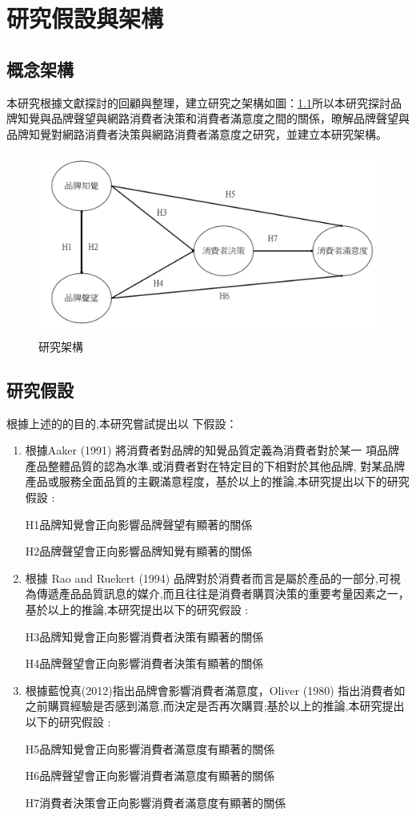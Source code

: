 \chapter{研究假設與架構}
\section{概念架構}
本研究根據文獻探討的回顧與整理，建立研究之架構如圖：\ref{fig:ARC}所以本研究探討品牌知覺與品牌聲望與網路消費者決策和消費者滿意度之間的關係，暸解品牌聲望與品牌知覺對網路消費者決策與網路消費者滿意度之研究，並建立本研究架構。


\begin{figure}[!t]
\centering
\includegraphics[width=14cm]{images/論文架構.png}
\caption{研究架構}
\label{fig:ARC}
\end{figure}

\section{研究假設}
根據上述的的目的,本研究嘗試提出以 下假設：
\begin{enumerate}
\item 根據Aaker (1991) 將消費者對品牌的知覺品質定義為消費者對於某一 項品牌產品整體品質的認為水準,或消費者對在特定目的下相對於其他品牌, 對某品牌產品或服務全面品質的主觀滿意程度，基於以上的推論,本研究提出以下的研究假設 :

H1品牌知覺會正向影響品牌聲望有顯著的關係

H2品牌聲望會正向影響品牌知覺有顯著的關係

\item 根據 Rao and Ruekert (1994) 品牌對於消費者而言是屬於產品的一部分,可視為傳遞產品品質訊息的媒介,而且往往是消費者購買決策的重要考量因素之一，基於以上的推論,本研究提出以下的研究假設 :

H3品牌知覺會正向影響消費者決策有顯著的關係

H4品牌聲望會正向影響消費者決策有顯著的關係

\item 根據藍悅真(2012)指出品牌會影響消費者滿意度，Oliver (1980) 指出消費者如之前購買經驗是否感到滿意,而決定是否再次購買;基於以上的推論,本研究提出以下的研究假設 :

H5品牌知覺會正向影響消費者滿意度有顯著的關係

H6品牌聲望會正向影響消費者滿意度有顯著的關係

H7消費者決策會正向影響消費者滿意度有顯著的關係

\end{enumerate}

